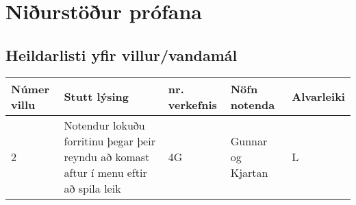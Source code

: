 \documentclass{article}
\begin{document}
\section{Niðurstöður prófana}
\subsection*{Heildarlisti yfir villur/vandamál}
\begin{tabular}{p{}p{}p{}p{}p{}}
    \hline
    Númer villu &Stutt lýsing&nr. verkefnis&Nöfn notenda&Alvarleiki\\
    \hline
    2           &Notendur lokuðu forritinu þegar þeir reyndu að komast aftur í menu eftir að spila leik&4G&Gunnar og Kjartan&L\\ 
    \hline          
\end{tabular}
\end{document}
